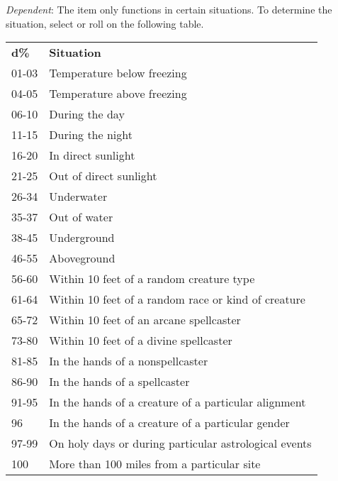 \textit{Dependent}: The item only functions in certain situations. To determine the situation, select or roll on the following table.
\begin{tabularx}{\linewidth}{lX}
\textbf{d\%} & \textbf{Situation}                                    \\
01-03        & Temperature below freezing                            \\
04-05        & Temperature above freezing                            \\
06-10        & During the day                                        \\
11-15        & During the night                                      \\
16-20        & In direct sunlight                                    \\
21-25        & Out of direct sunlight                                \\
26-34        & Underwater                                            \\
35-37        & Out of water                                          \\
38-45        & Underground                                           \\
46-55        & Aboveground                                           \\
56-60        & Within 10 feet of a random creature type              \\
61-64        & Within 10 feet of a random race or kind of creature   \\
65-72        & Within 10 feet of an arcane spellcaster               \\
73-80        & Within 10 feet of a divine spellcaster                \\
81-85        & In the hands of a nonspellcaster                      \\
86-90        & In the hands of a spellcaster                         \\
91-95        & In the hands of a creature of a particular alignment  \\
96           & In the hands of a creature of a particular gender     \\
97-99        & On holy days or during particular astrological events \\
100            & More than 100 miles from a particular site           
\end{tabularx}

